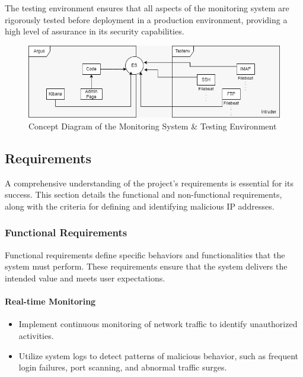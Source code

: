 \documentclass{article}
\begin{document}
    \noindent The testing environment ensures that all aspects of the monitoring system are rigorously tested before deployment in a production environment, providing a high level of assurance in its security capabilities.

    \begin{figure}[H]
        \centering
        \includegraphics[width=\textwidth]{./images/concept.jpg}
        \caption{Concept Diagram of the Monitoring System \& Testing Environment}\label{fig:concept-diagram}
    \end{figure}

    \newpage
    \subsection{Requirements}\label{subsec:requirements}

    A comprehensive understanding of the project's requirements is essential for its success.
    This section details the functional and non-functional requirements, along with the criteria for defining and identifying malicious IP addresses.

    \subsubsection{Functional Requirements}\label{subsubsec:functional-requirements}

    Functional requirements define specific behaviors and functionalities that the system must perform.
    These requirements ensure that the system delivers the intended value and meets user expectations.

    \paragraph{Real-time Monitoring}
    \begin{itemize}
        \item Implement continuous monitoring of network traffic to identify unauthorized activities.
        \item Utilize system logs to detect patterns of malicious behavior, such as frequent login failures, port scanning, and abnormal traffic surges.
    \end{itemize}
\end{document}
